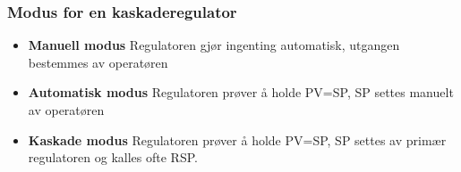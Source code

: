 \documentclass[aspectratio=169,xcolor=dvipsnames]{beamer}
\begin{document}
%
	\begin{frame}
		\frametitle{Modus for en kaskaderegulator}

		\begin{itemize}
			\item \textbf{Manuell modus} Regulatoren gjør ingenting automatisk, utgangen bestemmes av operatøren
			\item \textbf{Automatisk modus} Regulatoren prøver å holde PV=SP, SP settes manuelt av operatøren
			\item \textbf{Kaskade modus} Regulatoren prøver å holde PV=SP, SP settes av primær regulatoren og kalles ofte RSP. 
		\end{itemize}

		
	\end{frame}
%
%
%
%
%
%
%
%
%
%
%
%
%
%
%
\end{document}

